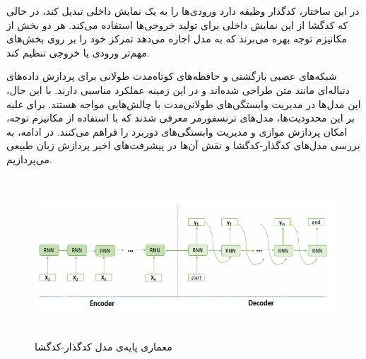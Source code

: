 در این ساختار، کدگذار وظیفه دارد ورودی‌ها را به یک نمایش داخلی تبدیل کند، در حالی که کدگشا از این نمایش داخلی برای تولید خروجی‌ها استفاده می‌کند. هر دو بخش از مکانیزم توجه بهره می‌برند که به مدل اجازه می‌دهد تمرکز خود را بر روی بخش‌های مهم‌تر ورودی یا خروجی تنظیم کند. 

شبکه‌های عصبی بازگشتی  و حافظه‌های کوتاه‌مدت طولانی  برای پردازش داده‌های دنباله‌ای مانند متن طراحی شده‌اند و در این زمینه عملکرد مناسبی دارند. با این حال، این مدل‌ها در مدیریت وابستگی‌های طولانی‌مدت با چالش‌هایی مواجه هستند. برای غلبه بر این محدودیت‌ها، مدل‌های ترنسفورمر معرفی شدند که با استفاده از مکانیزم توجه، امکان پردازش موازی و مدیریت وابستگی‌های دوربرد را فراهم می‌کنند. در ادامه، به بررسی مدل‌های کدگذار-کدگشا و نقش آن‌ها در پیشرفت‌های اخیر پردازش زبان طبیعی می‌پردازیم. 
\begin{figure}[!h]
	\begin{center}
		\includegraphics[height=6cm]{encoder_decoder.png}
	\end{center}
	\caption{معماری پایه‌‌ی مدل کدگذار-کدگشا \cite{RL_survey}}
	\label{fig:encoder_decoder}
	\medskip
	\small
\end{figure}

